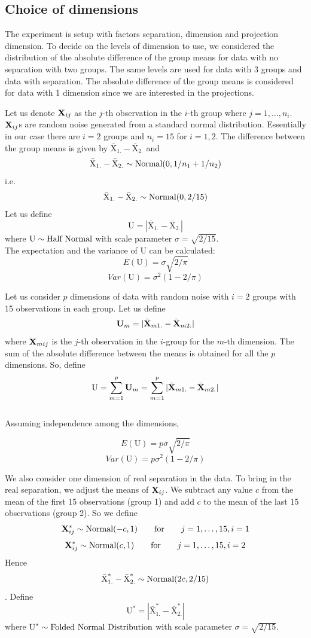 \subsection*{Choice of dimensions} \label{sec:theory}

The experiment is setup with factors separation, dimension and projection dimension. To decide on the levels of dimension to use, we considered the distribution of the absolute difference of the group means for data with no separation with two groups. The same levels are used for data with 3 groups and data with separation. The absolute difference of the group means is considered for data with 1 dimension since we are interested in the projections.

Let us denote ${\bf{X}}_{ij}$ as the $j$-th observation in the $i$-th group where $j = 1, \dots, n_i$. ${\bf{X}}_{ij}$s are random noise generated from a standard normal distribution. Essentially in our case there are $i = 2$ groups and $n_i = 15$ for $i = 1, 2$. The difference between the group means is given by $\bar{\mbox{X}}_{1.} - \bar{\mbox{X}}_{2.}$ and $$\bar{\mbox{X}}_{1.} - \bar{\mbox{X}}_{2.} \sim \hbox{Normal}(0, 1/n_1 + 1/n_2)$$ i.e. $$\bar{\mbox{X}}_{1.} - \bar{\mbox{X}}_{2.} \sim \hbox{Normal}(0, 2/15)$$ Let us define 
$$\mbox{U} = |\bar{\mbox{X}} _{1.} - \bar{\mbox{X}}_{2.}|$$ 
where $\mbox{U} \sim \hbox{Half Normal}$ with scale parameter $ \sigma = \sqrt{2/15}$. \\

The expectation and the variance of $\mbox{U}$ can be calculated: 
$$E(\mbox{U} ) = \sigma \sqrt{2/\pi}$$
$$Var(\mbox{U}) = \sigma^2 (1 - 2/\pi)$$

Let us consider $p$ dimensions of data with random noise with $i = 2$ groups with 15 observations in each group. Let us define $${\bf{U}}_m = |\bar{{\bf{X}}}_{m1.} - \bar{{\bf{X}}}_{m2.}|$$ where ${\bf{X}} _{mij}$ is the $j$-th observation in the $i$-group for the $m$-th dimension. The sum of the absolute difference between the means is obtained for all the $p$ dimensions. So, define $$\mbox{U}  = \sum_{m=1}^p {\bf{U}} _m = \sum_{m=1}^p |\bar{{\bf{X}}}_{m1.} - \bar{{\bf{X}}}_{m2.}| $$ \\

Assuming independence among the dimensions,

$$E(\mbox{U}) = p \sigma \sqrt{2/\pi}$$
$$Var(\mbox{U}) = p \sigma^2 (1 - 2/\pi)$$

We also consider one dimension of real separation in the data. To bring in the real separation, we adjust the means of ${\bf{X}}_{ij}$. We subtract any value $c$ from the mean of the first 15 observations (group 1) and add $c$ to the mean of the last 15 observations (group 2). So we define
$${\bf{X}}_{ij}^* \sim \hbox{Normal}(- c, 1) \qquad \hbox{for} \qquad j = 1, \dots, 15, i = 1$$
$${\bf{X}}_{ij}^* \sim \hbox{Normal}(c, 1) \qquad \hbox{for} \qquad j = 1, \dots, 15, i = 2$$ 
Hence $$\bar{\mbox{X}}_{1.}^* - \bar{\mbox{X}}_{2.}^* \sim \hbox{Normal}(2c, 2/15)$$. Define $$\mbox{U}^*  = |\bar{\mbox{X}}_{1.}^* - \bar{\mbox{X}}_{2.}^*|$$ where ${\mbox{U}}^* \sim \hbox{Folded Normal Distribution}$ with scale parameter $ \sigma = \sqrt{2/15}$.  \\


